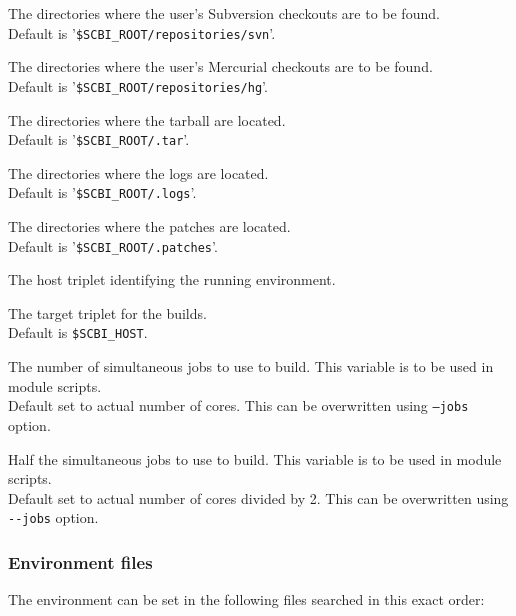 \documentclass[a4paper,12pt,twoside]{article}
\let\olditem=\item
\def\myitem[#1]{\vspace{10pt}\olditem[#1]}
\newcommand{\code}[1]{\texttt{#1}}
\newcommand{\file}[1]{'{\texttt{#1}}'}
\newcommand{\ddash}{-{}-}
\begin{document}
\begin{description}[before=\let\item\myitem]
	\item[SCBI\_SVN\_REPO] The directories where the user's Subversion checkouts are to be found. \\ Default is \file{\$SCBI\_ROOT/repositories/svn}.

	\item[SCBI\_HG\_REPO] The directories where the user's Mercurial checkouts are to be found. \\ Default is \file{\$SCBI\_ROOT/repositories/hg}.

	\item[SCBI\_TAR] The directories where the tarball are located. \\Default is \file{\$SCBI\_ROOT/.tar}.

	\item[SCBI\_LOGS] The directories where the logs are located. \\Default is \file{\$SCBI\_ROOT/.logs}.

	\item[SCBI\_PATCH] The directories where the patches are located. \\Default is \file{\$SCBI\_ROOT/.patches}.

	\item[SCBI\_HOST] The host triplet identifying the running environment.

	\item[SCBI\_TARGET] The target triplet for the builds. \\Default is \code{\$SCBI\_HOST}.

	\item[SCBI\_JOBS] The number of simultaneous jobs to use to build. This variable is to be used in module scripts. \\Default set to actual number of cores. This can be overwritten using \code{--jobs} option.
	\label{njobs}
	\item[SCBI\_HALF\_JOBS] Half the simultaneous jobs to use to build. This variable is to be used in module scripts. \\Default set to actual number of cores divided by 2. This can be overwritten using \code{\ddash{}jobs} option.\label{half-njobs}
\end{description}

\subsubsection{Environment files}
\label{envfile}

The environment can be set in the following files searched in this exact order:
\end{document}
